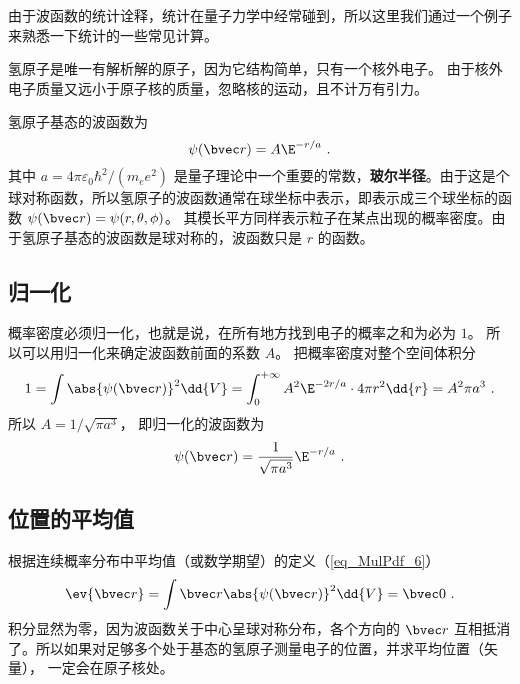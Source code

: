 

由于波函数的统计诠释，统计在量子力学中经常碰到，所以这里我们通过一个例子来熟悉一下统计的一些常见计算。

氢原子是唯一有解析解的原子，因为它结构简单，只有一个核外电子。 由于核外电子质量又远小于原子核的质量，忽略核的运动，且不计万有引力。

氢原子基态的波函数为
\begin{equation}
\psi(\bvec r) = A\E^{-r/a}~.
\end{equation}
其中 $a = 4\pi\varepsilon_0 \hbar ^2/(m_e e^2)$ 是量子理论中一个重要的常数，\textbf{玻尔半径}。由于这是个球对称函数，所以氢原子的波函数通常在球坐标中表示，即表示成三个球坐标的函数 $\psi (\bvec r) = \psi (r, \theta, \phi)$。 其模长平方同样表示粒子在某点出现的概率密度。由于氢原子基态的波函数是球对称的，波函数只是 $r$ 的函数。

\subsection{归一化}
  
概率密度必须归一化，也就是说，在所有地方找到电子的概率之和为必为 $1$。 所以可以用归一化来确定波函数前面的系数 $A$。 把概率密度对整个空间体积分
\begin{equation}
1 = \int \abs{\psi(\bvec r)} ^2 \dd{V}  = \int_0^{+\infty} A^2 \E^{-2r/a} \cdot 4\pi r^2\dd{r} = A^2 \pi a^3~.
\end{equation}
所以 $A = 1/\sqrt{\pi a^3}$， 即归一化的波函数为
\begin{equation}
\psi (\bvec r) = \frac{1}{\sqrt{\pi a^3}} \E^{-r/a}~.
\end{equation}

\subsection{位置的平均值}

 根据连续概率分布中平均值（或数学期望）的定义（\autoref{eq_MulPdf_6}）
\begin{equation}
\ev{\bvec r} = \int \bvec r \abs{\psi (\bvec r)} ^2 \dd{V} =  \bvec 0~.
\end{equation}
积分显然为零，因为波函数关于中心呈球对称分布，各个方向的 $\bvec r$ 互相抵消了。所以如果对足够多个处于基态的氢原子测量电子的位置，并求平均位置（矢量）， 一定会在原子核处。

